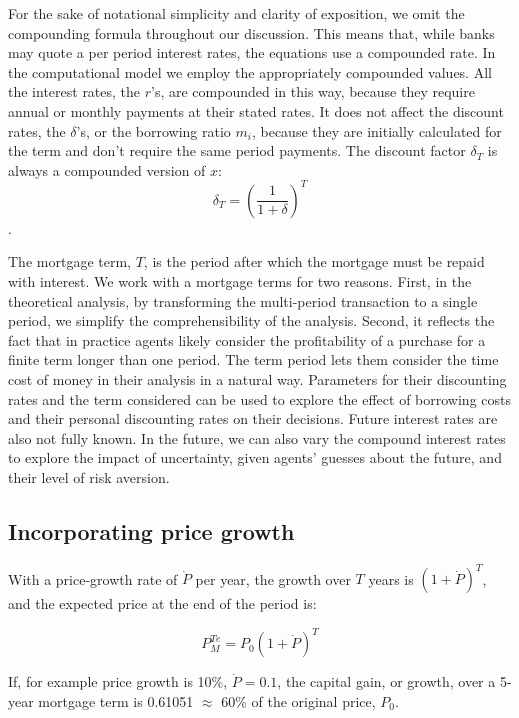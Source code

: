 For the sake of notational simplicity and clarity of exposition,  we omit the compounding formula throughout our discussion. This means that, while banks may quote a per period interest rates, the equations use a compounded rate. In the computational model we employ the appropriately compounded values. All %
 the interest rates, the $r$'s, are compounded in this way, because they require annual or monthly payments at their stated rates.
 It does not affect the discount rates, the $\delta$'s, or the borrowing ratio $m_i$, because they are initially calculated for the term and don't require the same period payments.
 The discount factor $\delta_T$ is always a compounded version of $x$:
 \[\delta_T=\left(\frac{1}{1+\delta}\right)^T\].

 The {mortgage term}, $T$, is the period after which the mortgage must be repaid with interest. We work with a mortgage terms for two reasons. First, in the theoretical analysis, by transforming the multi-period transaction to a single period, we simplify the comprehensibility of the analysis. Second, it reflects the fact that in practice agents  likely consider the profitability of a purchase for a finite term longer than one period. The term period lets them consider the time cost of money in their analysis in a natural way. Parameters for their discounting rates and the term considered can be used to explore the effect of borrowing costs and their personal discounting rates on their decisions. Future interest rates are also not fully known. In the future, we can also vary the compound interest rates to explore the impact of uncertainty, given agents' guesses about the future, and their level of risk aversion.

 
\subsection{Incorporating price growth}

With a price-growth rate of $\dot P$ per year, the growth over $T$ years is $(1+\dot P)^T$, and  %
the expected price at the end of the period is:

\[P_M^{Te}=P_0(1+\dot P)^T\]

If, for example price growth is 10\%, $\dot P= 0.1$, the {capital gain}, or growth, over a 5-year mortgage term is 0.61051 $\approx$ 60\% of the original price, $P_0$.



